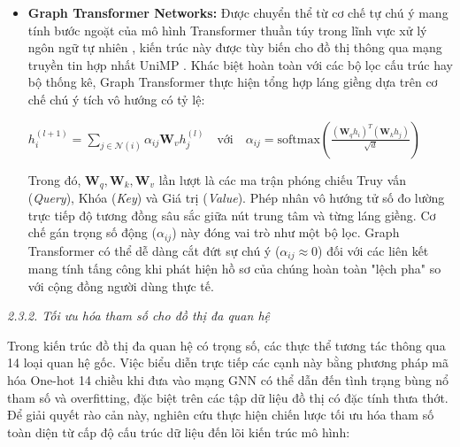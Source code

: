 \begin{itemize}[label={--}, itemsep=5pt]
    \item \textbf{Graph Transformer Networks:} Được chuyển thể từ cơ chế tự chú ý mang tính bước ngoặt của mô hình Transformer thuần túy trong lĩnh vực xử lý ngôn ngữ tự nhiên \cite{vaswani2017attention}, kiến trúc này được tùy biến cho đồ thị thông qua mạng truyền tin hợp nhất UniMP \cite{shi2020masked}. Khác biệt hoàn toàn với các bộ lọc cấu trúc hay bộ thống kê, Graph Transformer thực hiện tổng hợp láng giềng dựa trên cơ chế chú ý tích vô hướng có tỷ lệ:
    \begin{center}
    \(
        h_i^{(l+1)} = \sum_{j \in \mathcal{N}(i)} \alpha_{ij} \mathbf{W}_v h_j^{(l)} \quad \text{với} \quad \alpha_{ij} = \text{softmax} \left( \frac{(\mathbf{W}_q h_i)^T (\mathbf{W}_k h_j)}{\sqrt{d}} \right)
    \)
    \end{center}
    Trong đó, $\mathbf{W}_q, \mathbf{W}_k, \mathbf{W}_v$ lần lượt là các ma trận phóng chiếu Truy vấn (\textit{Query}), Khóa (\textit{Key}) và Giá trị (\textit{Value}). Phép nhân vô hướng tử số đo lường trực tiếp độ tương đồng sâu sắc giữa nút trung tâm và từng láng giềng. Cơ chế gán trọng số động ($\alpha_{ij}$) này đóng vai trò như một bộ lọc. Graph Transformer có thể dễ dàng cắt đứt sự chú ý ($\alpha_{ij} \approx 0$) đối với các liên kết mang tính tấng công khi phát hiện hồ sơ của chúng hoàn toàn "lệch pha" so với cộng đồng người dùng thực tế.
\end{itemize}


\textit{2.3.2. Tối ưu hóa tham số cho đồ thị đa quan hệ}\vspace{0.2cm}

Trong kiến trúc đồ thị đa quan hệ có trọng số, các thực thể tương tác thông qua 14 loại quan hệ gốc. Việc biểu diễn trực tiếp các cạnh này bằng phương pháp mã hóa One-hot 14 chiều khi đưa vào mạng GNN có thể dẫn đến tình trạng bùng nổ tham số và overfitting, đặc biệt trên các tập dữ liệu đồ thị có đặc tính thưa thớt. Để giải quyết rào cản này, nghiên cứu thực hiện chiến lược tối ưu hóa tham số toàn diện từ cấp độ cấu trúc dữ liệu đến lõi kiến trúc mô hình:


